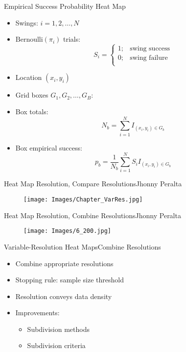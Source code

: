 \documentclass{beamer}
\def\bdm{\begin{displaymath}}
\def\edm{\end{displaymath}}
\begin{document}
\begin{frame}{Empirical Success Probability Heat Map} %

\begin{itemize}
\addtolength{\itemsep}{0.5\baselineskip}
\item Swings: $i = 1,2,\ldots, N$
\item $\text{Bernoulli}(\pi_{i})$ trials:
    \bdm
    S_i = \left\{\begin{array}{ll} 1; & \mbox{swing success} \\
    					 0; & \mbox{swing failure} \\ \end{array} \right.
    \edm
\item Location $(x_i,y_i)$
\item Grid boxes $G_1,G_2,\ldots,G_B$:
\item Box totals:
    \bdm
    N_b = \sum_{i=1}^N I_{(x_i,y_i) \in G_b}
    \edm
\item Box empirical success:
    \bdm
     p_b = \frac{1}{N_b} \sum_{i=1}^N S_i I_{(x_i,y_i) \in G_b}
    \edm
\end{itemize}
\end{frame}

\begin{frame}{Heat Map Resolution, Compare Resolutions}{Jhonny Peralta}
  \begin{figure}[H]
	\centering
	\texttt{[image: Images/Chapter\_VarRes.jpg]}
	\end{figure}
\end{frame}

\begin{frame}{Heat Map Resolution, Combine Resolutions}{Jhonny Peralta}
  \begin{figure}[H]
	\centering
	\texttt{[image: Images/6\_200.jpg]}
	\end{figure}
\end{frame}

\begin{frame}{Variable-Resolution Heat Maps}{Combine Resolutions}
\begin{itemize}
\addtolength{\itemsep}{0.5\baselineskip}
\item Combine appropriate resolutions
\item Stopping rule: sample size threshold
\item Resolution conveys data density
\item Improvements: 
  \begin{itemize}
  \addtolength{\itemsep}{0.5\baselineskip}
  \item Subdivision methods
  \item Subdivision criteria
  \end{itemize}
\end{itemize}
\end{frame}
\end{document}
